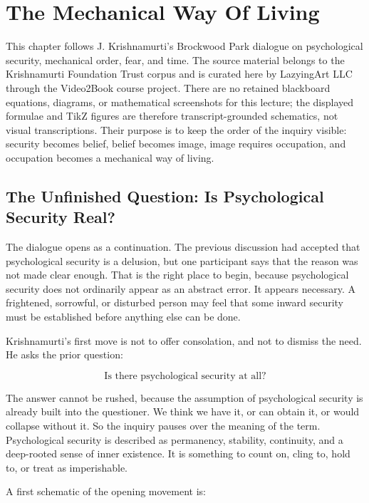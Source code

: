\chapter{The Mechanical Way Of Living}

This chapter follows J. Krishnamurti's Brockwood Park dialogue on psychological security, mechanical order, fear, and time. The source material belongs to the Krishnamurti Foundation Trust corpus and is curated here by LazyingArt LLC through the Video2Book course project. There are no retained blackboard equations, diagrams, or mathematical screenshots for this lecture; the displayed formulae and TikZ figures are therefore transcript-grounded schematics, not visual transcriptions. Their purpose is to keep the order of the inquiry visible: security becomes belief, belief becomes image, image requires occupation, and occupation becomes a mechanical way of living.

\section{The Unfinished Question: Is Psychological Security Real?}

The dialogue opens as a continuation. The previous discussion had accepted that psychological security is a delusion, but one participant says that the reason was not made clear enough. That is the right place to begin, because psychological security does not ordinarily appear as an abstract error. It appears necessary. A frightened, sorrowful, or disturbed person may feel that some inward security must be established before anything else can be done.

Krishnamurti's first move is not to offer consolation, and not to dismiss the need. He asks the prior question:

\begin{equation}
\text{Is there psychological security at all?}
\end{equation}

The answer cannot be rushed, because the assumption of psychological security is already built into the questioner. We think we have it, or can obtain it, or would collapse without it. So the inquiry pauses over the meaning of the term. Psychological security is described as permanency, stability, continuity, and a deep-rooted sense of inner existence. It is something to count on, cling to, hold to, or treat as imperishable.

A first schematic of the opening movement is:

